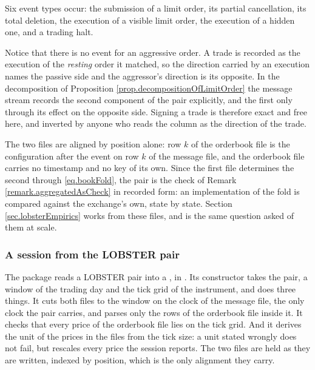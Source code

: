 Six event types occur:
the submission of a limit order,
its partial cancellation,
its total deletion,
the execution of a visible limit order,
the execution of a hidden one,
and a trading halt.

\begin{remark}\label{remark.passiveDirection}
 Notice that there is no event for an aggressive order.
 A trade is recorded as the execution of the \emph{resting} order it matched,
 so the direction carried by an execution names the passive side
 and the aggressor's direction is its opposite.
 In the decomposition of Proposition \ref{prop.decompositionOfLimitOrder}
 the message stream records the second component of the pair explicitly,
 and the first only through its effect on the opposite side.
 Signing a trade is therefore exact and free here,
 and inverted by anyone who reads the column as the direction of the trade.
\end{remark}

The two files are aligned by position alone:
row $k$ of the orderbook file is the configuration after the event on row $k$ of the message
file, and the orderbook file carries no timestamp and no key of its own.
Since the first file determines the second through \eqref{eq.bookFold},
the pair is the check of Remark \ref{remark.aggregatedAsCheck} in recorded form:
an implementation of the fold is compared against the exchange's own, state by state.
Section \ref{sec.lobsterEmpirics} works from these files,
and \cite{LPV22sho} is the same question asked of them at scale.

\subsubsection{A session from the LOBSTER pair}

The package reads a LOBSTER pair into a ,
in .
Its constructor  takes the pair,
a window of the trading day and the tick grid of the instrument, and does three things.
It cuts both files to the window on the clock of the message file,
the only clock the pair carries,
and parses only the rows of the orderbook file inside it.
It checks that every price of the orderbook file lies on the tick grid.
And it derives the unit of the prices in the files from the tick size:
a unit stated wrongly does not fail, but rescales every price the session reports.
The two files are held as they are written, indexed by position,
which is the only alignment they carry.

